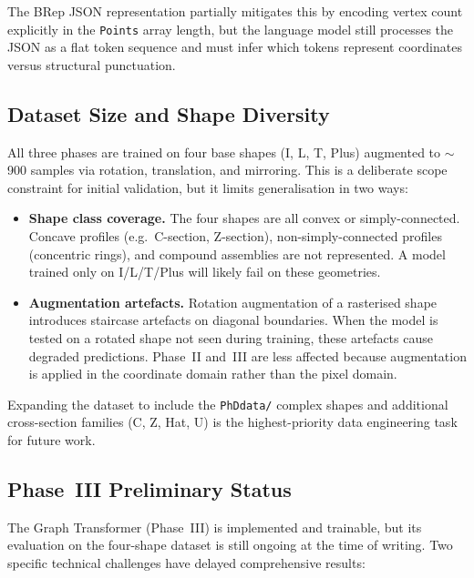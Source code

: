 \documentclass[journal]{IEEEtran}
\begin{document}
The BRep JSON representation partially mitigates this by encoding vertex count
explicitly in the \texttt{Points} array length, but the language model still
processes the JSON as a flat token sequence and must infer which tokens
represent coordinates versus structural punctuation.

\subsection{Dataset Size and Shape Diversity}

All three phases are trained on four base shapes (I, L, T, Plus) augmented to
$\sim$900 samples via rotation, translation, and mirroring.  This is a
deliberate scope constraint for initial validation, but it limits generalisation
in two ways:

\begin{itemize}
  \item \textbf{Shape class coverage.}  The four shapes are all convex or
        simply-connected.  Concave profiles (e.g.\ C-section, Z-section),
        non-simply-connected profiles (concentric rings), and compound
        assemblies are not represented.  A model trained only on I/L/T/Plus
        will likely fail on these geometries.

  \item \textbf{Augmentation artefacts.}  Rotation augmentation of a
        rasterised shape introduces staircase artefacts on diagonal boundaries.
        When the model is tested on a rotated shape not seen during training,
        these artefacts cause degraded predictions.  Phase~II and~III are less
        affected because augmentation is applied in the coordinate domain
        rather than the pixel domain.
\end{itemize}

Expanding the dataset to include the \texttt{PhDdata/} complex shapes and
additional cross-section families (C, Z, Hat, U) is the highest-priority data
engineering task for future work.

\subsection{Phase~III Preliminary Status}

The Graph Transformer (Phase~III) is implemented and trainable, but its
evaluation on the four-shape dataset is still ongoing at the time of writing.
Two specific technical challenges have delayed comprehensive results:
\end{document}
